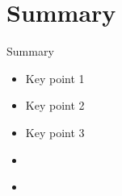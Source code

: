 \section{Summary}

\begin{frame}{Summary}
  \begin{itemize}
    \item Key point 1
    \item Key point 2
    \item Key point 3
    \item \cite{bass_engineering_2025}
    \item \cite{bass_software_2021}
  \end{itemize}
\end{frame}